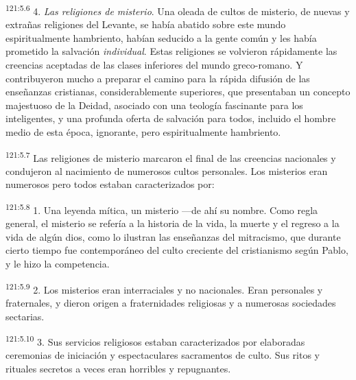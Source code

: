 \par 
\textsuperscript{121:5.6} 4. \textit{Las religiones de misterio}. Una oleada de cultos de misterio, de nuevas y extrañas religiones del Levante, se había abatido sobre este mundo espiritualmente hambriento, habían seducido a la gente común y les había prometido la salvación \textit{individual}. Estas religiones se volvieron rápidamente las creencias aceptadas de las clases inferiores del mundo greco-romano. Y contribuyeron mucho a preparar el camino para la rápida difusión de las enseñanzas cristianas, considerablemente superiores, que presentaban un concepto majestuoso de la Deidad, asociado con una teología fascinante para los inteligentes, y una profunda oferta de salvación para todos, incluido el hombre medio de esta época, ignorante, pero espiritualmente hambriento.

\par 
\textsuperscript{121:5.7} Las religiones de misterio marcaron el final de las creencias nacionales y condujeron al nacimiento de numerosos cultos personales. Los misterios eran numerosos pero todos estaban caracterizados por:

\par 
\textsuperscript{121:5.8} 1. Una leyenda mítica, un misterio ---de ahí su nombre. Como regla general, el misterio se refería a la historia de la vida, la muerte y el regreso a la vida de algún dios, como lo ilustran las enseñanzas del mitracismo, que durante cierto tiempo fue contemporáneo del culto creciente del cristianismo según Pablo, y le hizo la competencia.

\par 
\textsuperscript{121:5.9} 2. Los misterios eran interraciales y no nacionales. Eran personales y fraternales, y dieron origen a fraternidades religiosas y a numerosas sociedades sectarias.

\par 
\textsuperscript{121:5.10} 3. Sus servicios religiosos estaban caracterizados por elaboradas ceremonias de iniciación y espectaculares sacramentos de culto. Sus ritos y rituales secretos a veces eran horribles y repugnantes.

